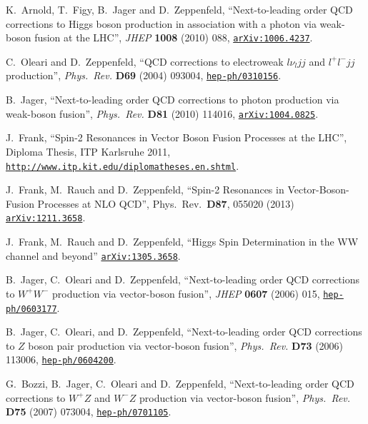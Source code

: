 \documentclass[english,12pt]{article}
\begin{document}
\begin{thebibliography}{10}
  K.~Arnold, T.~Figy, B.~Jager and D.~Zeppenfeld,
  ``Next-to-leading order QCD corrections to Higgs boson production in
  association with a photon via weak-boson fusion at the LHC'',
  {\em JHEP} {\bf 1008} (2010) 088,
\href{http://www.arXiv.org/abs/1006.4237}{{\tt arXiv:1006.4237}}.

C.~Oleari and D.~Zeppenfeld, ``QCD corrections to electroweak $l\nu_ljj$
and $l^+l^-jj$ production'', {\em Phys.\ Rev.} {\bf D69} (2004)
  093004,
\href{http://www.arXiv.org/abs/hep-ph/0310156}{{\tt hep-ph/0310156}}.

  B.~Jager,
  ``Next-to-leading order QCD corrections to photon production via weak-boson
  fusion'',
  {\em Phys.\ Rev.} {\bf D81} (2010) 114016,
 \href{http://arxiv.org/abs/1004.0825}{{\tt arXiv:1004.0825}}. 
  
J.~Frank, ``Spin-2 Resonances in Vector Boson Fusion Processes at the LHC'', 
{Diploma Thesis, ITP Karlsruhe 2011}, 
\href{http://www.itp.kit.edu/diplomatheses.en.shtml}{{\tt http://www.itp.kit.edu/diplomatheses.en.shtml}}.

  J.~Frank, M.~Rauch and D.~Zeppenfeld,
  ``Spin-2 Resonances in Vector-Boson-Fusion Processes at NLO QCD'',
  Phys.\ Rev.\ {\bf D87}, 055020 (2013)
 \href{http://arxiv.org/abs/1211.3658}{{\tt arXiv:1211.3658}}. 
  
  J.~Frank, M.~Rauch and D.~Zeppenfeld,
  ``Higgs Spin Determination in the WW channel and beyond''
 \href{http://arxiv.org/abs/1305.3658}{{\tt arXiv:1305.3658}}. 

B.~Jager, C.~Oleari and D.~Zeppenfeld, ``Next-to-leading order QCD corrections
  to $W^+ W^-$ production via vector-boson fusion'', {\em JHEP} {\bf 0607} 
(2006) 015,
\href{http://www.arXiv.org/abs/hep-ph/0603177}{{\tt hep-ph/0603177}}.

B.~Jager, C.~Oleari, and D.~Zeppenfeld, ``Next-to-leading order QCD corrections
  to $Z$ boson pair production via vector-boson fusion'', {\em Phys.\ Rev.} {\bf
  D73} (2006) 113006,
\href{http://www.arXiv.org/abs/hep-ph/0604200}{{\tt hep-ph/0604200}}.

G.~Bozzi, B.~Jager, C.~Oleari and D.~Zeppenfeld, ``Next-to-leading order QCD
  corrections to $W^+Z$ and $W^-Z$ production via vector-boson 
fusion'', {\em Phys.\ Rev.} {\bf D75} (2007) 073004,
\href{http://www.arXiv.org/abs/hep-ph/0701105}{{\tt hep-ph/0701105}}.


\end{thebibliography}
\end{document}
